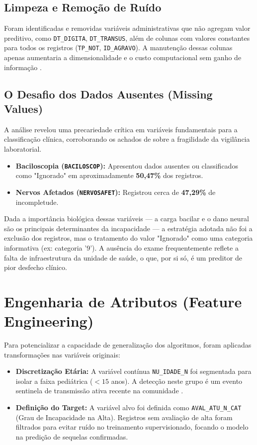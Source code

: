 \documentclass[12pt, a4paper]{report}
\begin{document}
\subsection{Limpeza e Remoção de Ruído}
Foram identificadas e removidas variáveis administrativas que não agregam valor preditivo, como \texttt{DT\_DIGITA}, \texttt{DT\_TRANSUS}, além de colunas com valores constantes para todos os registros (\texttt{TP\_NOT}, \texttt{ID\_AGRAVO}). A manutenção dessas colunas apenas aumentaria a dimensionalidade e o custo computacional sem ganho de informação \citep{saldanha2021ciencia}.

\subsection{O Desafio dos Dados Ausentes (Missing Values)}
A análise revelou uma precariedade crítica em variáveis fundamentais para a classificação clínica, corroborando os achados de \cite{sczmanski2025clinical} sobre a fragilidade da vigilância laboratorial.
\begin{itemize}
    \item \textbf{Baciloscopia (\texttt{BACILOSCOP}):} Apresentou dados ausentes ou classificados como "Ignorado" em aproximadamente \textbf{50,47\%} dos registros. 
    \item \textbf{Nervos Afetados (\texttt{NERVOSAFET}):} Registrou cerca de \textbf{47,29\%} de incompletude.
\end{itemize}
Dada a importância biológica dessas variáveis — a carga bacilar e o dano neural são os principais determinantes da incapacidade \citep{siqueira2025risk} — a estratégia adotada não foi a exclusão dos registros, mas o tratamento do valor "Ignorado" como uma categoria informativa (ex: categoria '9'). A ausência do exame frequentemente reflete a falta de infraestrutura da unidade de saúde, o que, por si só, é um preditor de pior desfecho clínico.

\section{Engenharia de Atributos (Feature Engineering)}
Para potencializar a capacidade de generalização dos algoritmos, foram aplicadas transformações nas variáveis originais:
\begin{itemize}
    \item \textbf{Discretização Etária:} A variável contínua \texttt{NU\_IDADE\_N} foi segmentada para isolar a faixa pediátrica ($<15$ anos). A detecção neste grupo é um evento sentinela de transmissão ativa recente na comunidade \citep{nobre2017spatial, barbosa2025spatial}.
    \item \textbf{Definição do Target:} A variável alvo foi definida como \texttt{AVAL\_ATU\_N\_CAT} (Grau de Incapacidade na Alta). Registros sem avaliação de alta foram filtrados para evitar ruído no treinamento supervisionado, focando o modelo na predição de sequelas confirmadas.
\end{itemize}
\end{document}
